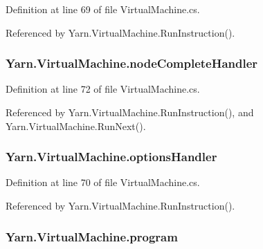 Definition at line 69 of file Virtual\-Machine.\-cs.



Referenced by Yarn.\-Virtual\-Machine.\-Run\-Instruction().

\hypertarget{a00152_a5129c63e67e2d4e2780d86b8351320a2}{
\subsubsection[{node\-Complete\-Handler}]{ Yarn.\-Virtual\-Machine.\-node\-Complete\-Handler}}\label{a00152_a5129c63e67e2d4e2780d86b8351320a2}


Definition at line 72 of file Virtual\-Machine.\-cs.



Referenced by Yarn.\-Virtual\-Machine.\-Run\-Instruction(), and Yarn.\-Virtual\-Machine.\-Run\-Next().

\hypertarget{a00152_acd25fe2e3aa90dc87ba25d9af904465b}{
\subsubsection[{options\-Handler}]{ Yarn.\-Virtual\-Machine.\-options\-Handler}}\label{a00152_acd25fe2e3aa90dc87ba25d9af904465b}


Definition at line 70 of file Virtual\-Machine.\-cs.



Referenced by Yarn.\-Virtual\-Machine.\-Run\-Instruction().

\hypertarget{a00152_a2695dbfe3d9df7ffa3f13ad2231217fb}{
\subsubsection[{program}]{ Yarn.\-Virtual\-Machine.\-program\hspace{0.3cm}{\ttfamily [private]}}}\label{a00152_a2695dbfe3d9df7ffa3f13ad2231217fb}


